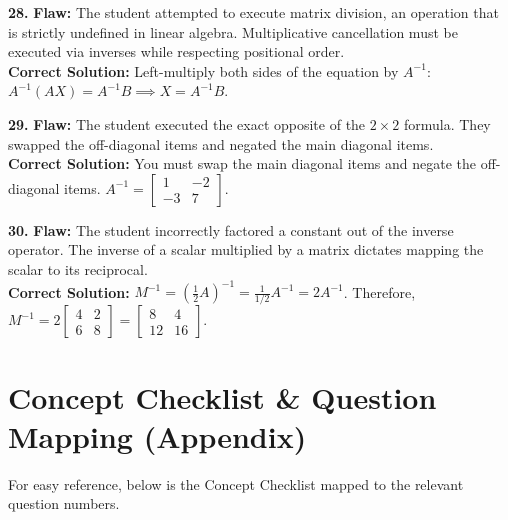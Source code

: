 \documentclass{article}
\begin{document}
\vspace{5pt}
\noindent
\textbf{28.} \textbf{Flaw:} The student attempted to execute matrix division, an operation that is strictly undefined in linear algebra. Multiplicative cancellation must be executed via inverses while respecting positional order. \\
\textbf{Correct Solution:} Left-multiply both sides of the equation by $A^{-1}$: $A^{-1}(AX) = A^{-1}B \implies X = A^{-1}B$.

\vspace{5pt}
\noindent
\textbf{29.} \textbf{Flaw:} The student executed the exact opposite of the $2 \times 2$ formula. They swapped the off-diagonal items and negated the main diagonal items. \\
\textbf{Correct Solution:} You must swap the main diagonal items and negate the off-diagonal items. $A^{-1} = \begin{bmatrix} 1 & -2 \\ -3 & 7 \end{bmatrix}$.

\vspace{5pt}
\noindent
\textbf{30.} \textbf{Flaw:} The student incorrectly factored a constant out of the inverse operator. The inverse of a scalar multiplied by a matrix dictates mapping the scalar to its reciprocal. \\
\textbf{Correct Solution:} $M^{-1} = (\frac{1}{2}A)^{-1} = \frac{1}{1/2} A^{-1} = 2 A^{-1}$. Therefore, $M^{-1} = 2 \begin{bmatrix} 4 & 2 \\ 6 & 8 \end{bmatrix} = \begin{bmatrix} 8 & 4 \\ 12 & 16 \end{bmatrix}$.

\newpage

\section{Concept Checklist \& Question Mapping (Appendix)}

For easy reference, below is the Concept Checklist mapped to the relevant question numbers.
\end{document}
